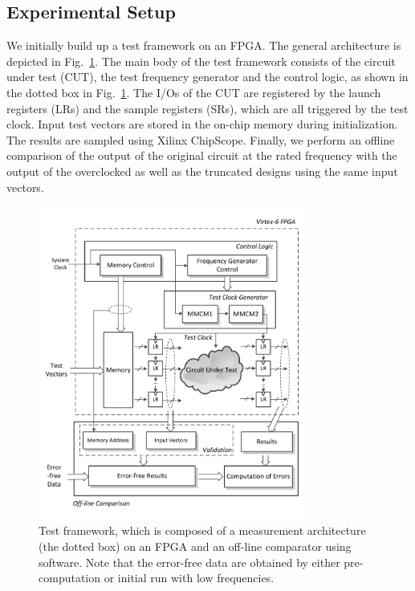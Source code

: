 \documentclass[journal]{IEEEtran}
\begin{document}
\subsection{Experimental Setup} \label{sub:experimental_setup}
We initially build up a test framework on an FPGA. The general architecture is depicted in Fig.~\ref{Test Framework}. The main body of the test framework consists of the circuit under test (CUT), the test frequency generator and the control logic, as shown in the dotted box in Fig.~\ref{Test Framework}. The I/Os of the CUT are registered by the launch registers (LRs) and the sample registers (SRs), which are all triggered by the test clock. Input test vectors are stored in the on-chip memory during initialization. The results are sampled using Xilinx ChipScope. Finally, we perform an offline comparison of the output of the original circuit at the rated frequency with the output of the overclocked as well as the truncated designs using the same input vectors.
%
\begin{figure}[htbp]
  \centering
  \includegraphics[width=3.5in]{./Figures/TestFramework.pdf}
  \caption{Test framework, which is composed of a measurement architecture (the dotted box) on an FPGA and an off-line comparator using software. Note that the error-free data are obtained by either pre-computation or initial run with low frequencies.}
  \label{Test Framework}
\end{figure}
\end{document}
